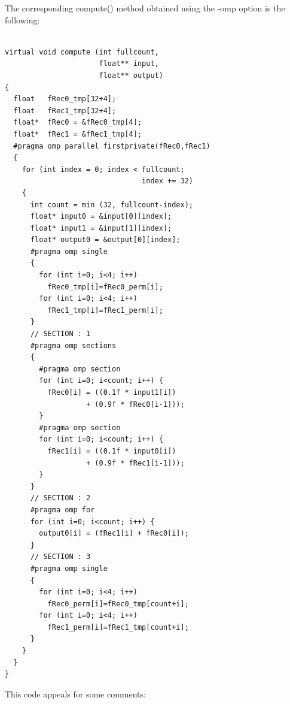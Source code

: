 \documentclass[a4paper]{book}
\begin{document}
The corresponding compute() method obtained using the -omp option is the following:
\begin{lstlisting}

virtual void compute (int fullcount, 
                      float** input, 
                      float** output) 
{
  float   fRec0_tmp[32+4];
  float   fRec1_tmp[32+4];
  float*  fRec0 = &fRec0_tmp[4];
  float*  fRec1 = &fRec1_tmp[4];
  #pragma omp parallel firstprivate(fRec0,fRec1)
  {
    for (int index = 0; index < fullcount; 
                                index += 32) 
    {
      int count = min (32, fullcount-index);
      float* input0 = &input[0][index];
      float* input1 = &input[1][index];
      float* output0 = &output[0][index];
      #pragma omp single
      {
        for (int i=0; i<4; i++) 
          fRec0_tmp[i]=fRec0_perm[i];
        for (int i=0; i<4; i++) 
          fRec1_tmp[i]=fRec1_perm[i];
      }
      // SECTION : 1
      #pragma omp sections
      {
        #pragma omp section
        for (int i=0; i<count; i++) {
          fRec0[i] = ((0.1f * input1[i]) 
                   + (0.9f * fRec0[i-1]));
        }
        #pragma omp section
        for (int i=0; i<count; i++) {
          fRec1[i] = ((0.1f * input0[i]) 
                   + (0.9f * fRec1[i-1]));
        }
      }
      // SECTION : 2
      #pragma omp for
      for (int i=0; i<count; i++) {
        output0[i] = (fRec1[i] + fRec0[i]);
      }
      // SECTION : 3
      #pragma omp single
      {
        for (int i=0; i<4; i++) 
          fRec0_perm[i]=fRec0_tmp[count+i];
        for (int i=0; i<4; i++) 
          fRec1_perm[i]=fRec1_tmp[count+i];
      }
    }
  }
}

\end{lstlisting}

This code appeals for some comments:
\end{document}
